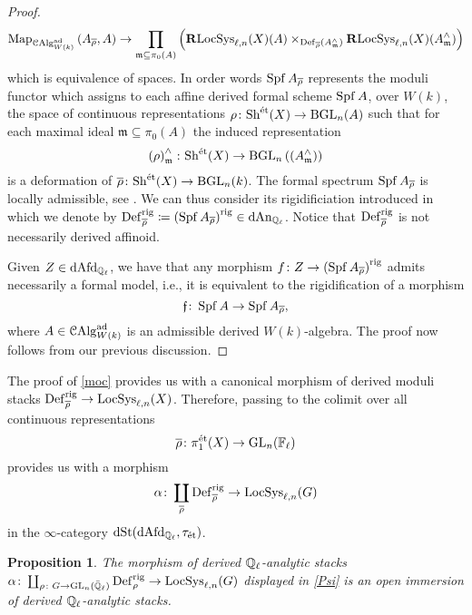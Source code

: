 \documentclass[10pt,a4paper]{amsart}
\numberwithin{equation}{subsection}
\theoremstyle{plain}
\newtheorem{prop}[theorem]{Proposition}
\theoremstyle{definition}
\theoremstyle{remark}
\numberwithin{equation}{section}
\begin{document}
\begin{proof}
	\[
		\mathrm{Map}_{\mathcal{C}\mathrm{Alg}^{\mathrm{ad}}_{W(k)}} \left( A_{\overline{\rho}}, A \right) \to \prod_{\mathfrak m \subseteq \pi_0(A)} \left( \mathbf R \mathrm{LocSys}_{\ell, n}(X)(A) \times_{\mathbf{\mathrm{Def}}_{\overline{\rho}} \left( A^\wedge_{\mathfrak m} \right)} \mathbf R \mathrm{LocSys}_{\ell, n}(X)(A^\wedge_{\mathfrak m}) 
		\right)
	\]
which is equivalence of spaces.
In order words $\operatorname{Spf} A_{\overline{\rho}}$ represents the moduli functor which assigns to each affine derived formal scheme
$\operatorname{Spf} A$, over $W(k)$, the space of continuous representations $ \rho \colon \mathrm{Sh}^{\text{\'et}}(X) \to \mathrm B \mathrm{GL}_n(A)$ such that for each maximal ideal $\mathfrak m \subseteq \pi_0(A)$ the induced representation 
	\[
		\left( \rho \right)^\wedge_{\mathfrak{m}} \colon \mathrm{Sh}^{\text{\'et}}(X) \to \mathrm B \mathrm{GL}_n \left( \left( A^\wedge_{\mathfrak{m}} \right) \right)
	\]
is a deformation of $\overline{\rho} \colon \mathrm{Sh}^{\text{\'et}}(X) \to \mathrm B \mathrm{GL}_n(k)$. The formal spectrum $\operatorname{Spf} A_{\overline{\rho}}$ is locally admissible, see \cite[Definition 3.1.1]{me2}. We can thus consider its rigidificiation introduced in
\cite[Proposition 3.1.2]{me2} which we denote by $\mathbf{\mathrm{Def}}^{\mathrm{rig}}_{\overline{\rho}}
\coloneqq \left( \operatorname{Spf} A_{\overline{\rho}} \right)^{\mathrm{rig}} \in \mathrm{dAn}_{\mathbb{Q}_\ell}$. Notice that
$\mathbf{\mathrm{Def}}^{\mathrm{rig}}_{\overline{\rho}}$ is not necessarily derived affinoid. 

Given $Z \in \mathrm{dAfd}_{\mathbb{Q}_\ell}$, we have that any morphism $ f \colon Z \to \left( \operatorname{Spf} A_{\overline{\rho}} \right)^{\mathrm{rig}}$ admits necessarily a formal model, i.e., it is equivalent to the rigidification of a morphism
	\[
		\mathfrak f \colon \operatorname{Spf} A \to \operatorname{Spf} A_{\overline{\rho}},
	\]
where $A  \in \mathcal{C}\mathrm{Alg}_{W(k)}^{\mathrm{ad}}$ is an admissible derived $W(k)$-algebra. The proof now follows from our previous discussion.
\end{proof}


The proof of \cref{moc} provides us with a canonical morphism of derived moduli stacks $\mathbf{\mathrm{Def}}^{\mathrm{rig}}_{\overline{\rho}} \to \mathrm{LocSys}_{\ell, n}(X)$. Therefore, passing to the colimit over all continuous representations
	\[
		\overline{\rho} \colon \pi_1^{\text{\'et}}(X) \to \mathrm{GL}_n(\mathbb F_\ell)
	\]
provides us with a morphism 
	\begin{equation} \label{Psi}
		\alpha   \colon
															\coprod_{\overline{\rho} } \mathbf{\mathrm{Def}}_{\overline{\rho} }^{\mathrm{rig}}
																\to
																															\mathrm{LocSys}_{\ell, n}(G)							
	\end{equation}
in the $\infty$-category $\mathrm{dSt}(\mathrm{dAfd}_{\mathbb{Q}_\ell}, \tau_{\text{\'et}})$.


\begin{prop} \label{open_im}
The morphism of derived $\mathbb{Q}_\ell$-analytic stacks $\alpha \colon \coprod_{\rho \colon G \to \mathrm{GL}_n(\bar{\mathbb{Q}}_{\ell}) } \mathbf{\mathrm{Def}}_{\rho}^{\mathrm{rig}} \to \mathrm{LocSys}_{\ell, n}(G)$ displayed in \eqref{Psi} is an open immersion of derived $\mathbb{Q}_{\ell}$-analytic stacks.
\end{prop}
\end{document}
